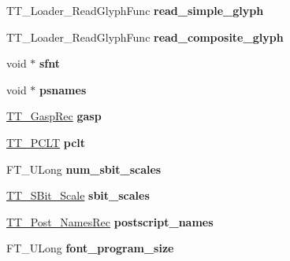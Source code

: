 \begin{DoxyCompactItemize}
\item 
\mbox{\label{structTT__FaceRec___aa9f550ad4e10d8232cdd3427e02e7603}} 
T\+T\+\_\+\+Loader\+\_\+\+Read\+Glyph\+Func {\bfseries read\+\_\+simple\+\_\+glyph}
\item 
\mbox{\label{structTT__FaceRec___ac261cd70ce36c35c615fc5e2319b40c4}} 
T\+T\+\_\+\+Loader\+\_\+\+Read\+Glyph\+Func {\bfseries read\+\_\+composite\+\_\+glyph}
\item 
\mbox{\label{structTT__FaceRec___ae8837db2bee34831a0927ceb2cb718cc}} 
void $\ast$ {\bfseries sfnt}
\item 
\mbox{\label{structTT__FaceRec___a2e73f7d8be949b37d3bc65040c2227d1}} 
void $\ast$ {\bfseries psnames}
\item 
\mbox{\label{structTT__FaceRec___a042468253b53931f4901ac47e37fbe14}} 
\hyperlink{structTT__Gasp__}{T\+T\+\_\+\+Gasp\+Rec} {\bfseries gasp}
\item 
\mbox{\label{structTT__FaceRec___a18faed293bc94ac00fa7612b175adc0e}} 
\hyperlink{structTT__PCLT__}{T\+T\+\_\+\+P\+C\+LT} {\bfseries pclt}
\item 
\mbox{\label{structTT__FaceRec___a5437fbf3ee625e001c28ec975326922a}} 
F\+T\+\_\+\+U\+Long {\bfseries num\+\_\+sbit\+\_\+scales}
\item 
\mbox{\label{structTT__FaceRec___a13215cb0365ee61c889385919fbd381f}} 
\hyperlink{structTT__SBit__ScaleRec__}{T\+T\+\_\+\+S\+Bit\+\_\+\+Scale} {\bfseries sbit\+\_\+scales}
\item 
\mbox{\label{structTT__FaceRec___a875e8db9ffdf04b9e157c801c56921d0}} 
\hyperlink{structTT__Post__NamesRec__}{T\+T\+\_\+\+Post\+\_\+\+Names\+Rec} {\bfseries postscript\+\_\+names}
\item 
\mbox{\label{structTT__FaceRec___ae0f510b460d6af3d62ce4c6b83247a39}} 
F\+T\+\_\+\+U\+Long {\bfseries font\+\_\+program\+\_\+size}
\item 
\mbox{\label{structTT__FaceRec___abaea73065232ac89472ea5474f362274}} 

\end{DoxyCompactItemize}

